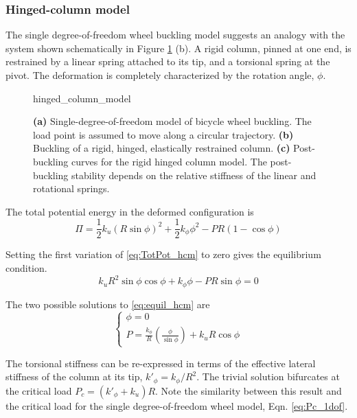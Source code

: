 \documentclass[\rootdir/thesis.tex]{subfiles}
\begin{document}
\subsubsection{Hinged-column model}

The single degree-of-freedom wheel buckling model suggests an analogy with the system shown schematically in Figure \ref{fig:hinged_column_model} (b). A rigid column, pinned at one end, is restrained by a linear spring attached to its tip, and a torsional spring at the pivot. The deformation is completely characterized by the rotation angle, $\phi$.

\begin{figure}[h]
\centering
{hinged_column_model}
\caption{\textbf{(a)} Single-degree-of-freedom model of bicycle wheel buckling. The load point is assumed to move along a circular trajectory. \textbf{(b)} Buckling of a rigid, hinged, elastically restrained column. \textbf{(c)} Post-buckling curves for the rigid hinged column model. The post-buckling stability depends on the relative stiffness of the linear and rotational springs.}
\label{fig:hinged_column_model}
\end{figure}

The total potential energy in the deformed configuration is
\begin{equation}
\label{eq:TotPot_hcm}
\Pi = \frac{1}{2}k_u(R\sin{\phi})^2 + \frac{1}{2}k_{\phi}\phi^2
    - PR(1-\cos{\phi})
\end{equation}

Setting the first variation of \eqref{eq:TotPot_hcm} to zero gives the equilibrium condition.
\begin{equation}
\label{eq:equil_hcm}
k_u R^2 \sin{\phi}\cos{\phi} + k_{\phi}\phi - PR\sin{\phi} = 0
\end{equation}

The two possible solutions to \eqref{eq:equil_hcm} are
\begin{equation}
\label{eq:P_hcm}
\begin{cases}
\phi = 0\\
P = \frac{k_{\phi}}{R}\left(\frac{\phi}{\sin{\phi}}\right) + k_u R\cos{\phi}
\end{cases}
\end{equation}

The torsional stiffness can be re-expressed in terms of the effective lateral stiffness of the column at its tip, $k'_{\phi}=k_{\phi}/R^2$. The trivial solution bifurcates at the critical load $P_c=(k'_{\phi} + k_u) R$. Note the similarity between this result and the critical load for the single degree-of-freedom wheel model, Eqn. \eqref{eq:Pc_1dof}.
\end{document}
